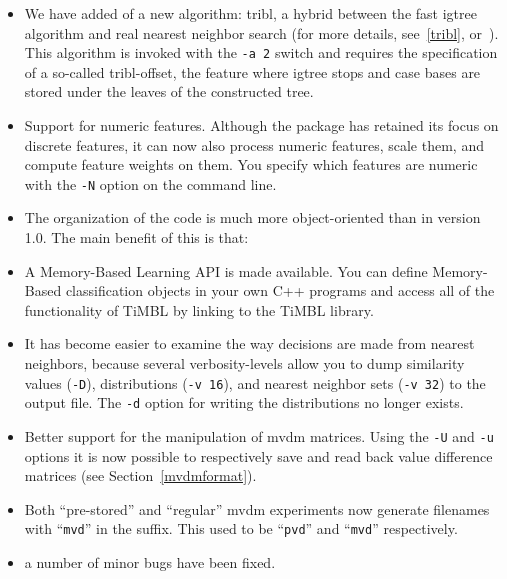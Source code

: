 \documentclass{report}
\begin{document}
\begin{itemize}

\item We have added of a new algorithm: {\sc tribl}, a hybrid between
the fast {\sc igtree} algorithm and real nearest neighbor search (for
more details, see~\ref{tribl}, or~\cite{Daelemans+97d}). This
algorithm is invoked with the {\tt -a 2} switch and requires the
specification of a so-called {\sc tribl}-offset, the feature where
{\sc igtree} stops and case bases are stored under the leaves of the
constructed tree.

\item Support for numeric features. Although the package has retained
its focus on discrete features, it can now also process numeric
features, scale them, and compute feature weights on them. You
specify which features are numeric with the {\tt -N} option on the
command line.

\item The organization of the code is much more object-oriented than
in version 1.0. The main benefit of this is that:

\item A Memory-Based Learning API is made available. You can define
Memory-Based classification objects in your own C++ programs and
access all of the functionality of TiMBL by linking to the TiMBL
library.

\item It has become easier to examine the way decisions are made from
nearest neighbors, because several verbosity-levels allow you to dump
similarity values ({\tt -D}), distributions ({\tt -v 16}), and nearest
neighbor sets ({\tt -v 32}) to the output file. The {\tt -d} option
for writing the distributions no longer exists.

\item Better support for the manipulation of {\sc mvdm}
matrices. Using the {\tt -U} and {\tt -u} options it is now possible
to respectively save and read back value difference matrices (see
Section~\ref{mvdmformat}).

\item Both ``pre-stored'' and ``regular'' {\sc mvdm} experiments now
generate filenames with ``{\tt mvd}'' in the suffix. This used to be
``{\tt pvd}'' and ``{\tt mvd}'' respectively.

\item a number of minor bugs have been fixed.

\end{itemize}
\end{document}
